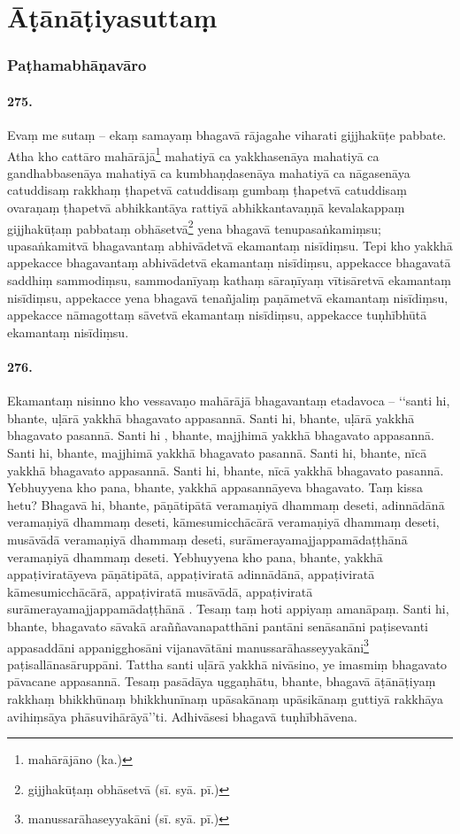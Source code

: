 \section{Āṭānāṭiyasuttaṃ}

\subsubsection{Paṭhamabhāṇavāro}

\paragraph{275.} Evaṃ me sutaṃ – ekaṃ samayaṃ bhagavā rājagahe viharati gijjhakūṭe pabbate. Atha kho cattāro mahārājā\footnote{mahārājāno (ka.)} mahatiyā ca yakkhasenāya mahatiyā ca gandhabbasenāya mahatiyā ca kumbhaṇḍasenāya mahatiyā ca nāgasenāya catuddisaṃ rakkhaṃ ṭhapetvā catuddisaṃ gumbaṃ ṭhapetvā catuddisaṃ ovaraṇaṃ ṭhapetvā abhikkantāya rattiyā abhikkantavaṇṇā kevalakappaṃ gijjhakūṭaṃ pabbataṃ obhāsetvā\footnote{gijjhakūṭaṃ obhāsetvā (sī. syā. pī.)} yena bhagavā tenupasaṅkamiṃsu; upasaṅkamitvā bhagavantaṃ abhivādetvā ekamantaṃ nisīdiṃsu. Tepi kho yakkhā appekacce bhagavantaṃ abhivādetvā ekamantaṃ nisīdiṃsu, appekacce bhagavatā saddhiṃ sammodiṃsu, sammodanīyaṃ kathaṃ sāraṇīyaṃ vītisāretvā ekamantaṃ nisīdiṃsu, appekacce yena bhagavā tenañjaliṃ paṇāmetvā ekamantaṃ nisīdiṃsu, appekacce nāmagottaṃ sāvetvā ekamantaṃ nisīdiṃsu, appekacce tuṇhībhūtā ekamantaṃ nisīdiṃsu.

\paragraph{276.} Ekamantaṃ nisinno kho vessavaṇo mahārājā bhagavantaṃ etadavoca – ‘‘santi hi, bhante, uḷārā yakkhā bhagavato appasannā. Santi hi, bhante, uḷārā yakkhā bhagavato pasannā. Santi hi , bhante, majjhimā yakkhā bhagavato appasannā. Santi hi, bhante, majjhimā yakkhā bhagavato pasannā. Santi hi, bhante, nīcā yakkhā bhagavato appasannā. Santi hi, bhante, nīcā yakkhā bhagavato pasannā. Yebhuyyena kho pana, bhante, yakkhā appasannāyeva bhagavato. Taṃ kissa hetu? Bhagavā hi, bhante, pāṇātipātā veramaṇiyā dhammaṃ deseti, adinnādānā veramaṇiyā dhammaṃ deseti, kāmesumicchācārā veramaṇiyā dhammaṃ deseti, musāvādā veramaṇiyā dhammaṃ deseti, surāmerayamajjappamādaṭṭhānā veramaṇiyā dhammaṃ deseti. Yebhuyyena kho pana, bhante, yakkhā appaṭiviratāyeva pāṇātipātā, appaṭiviratā adinnādānā, appaṭiviratā kāmesumicchācārā, appaṭiviratā musāvādā, appaṭiviratā surāmerayamajjappamādaṭṭhānā . Tesaṃ taṃ hoti appiyaṃ amanāpaṃ. Santi hi, bhante, bhagavato sāvakā araññavanapatthāni pantāni senāsanāni paṭisevanti appasaddāni appanigghosāni vijanavātāni manussarāhasseyyakāni\footnote{manussarāhaseyyakāni (sī. syā. pī.)} paṭisallānasāruppāni. Tattha santi uḷārā yakkhā nivāsino, ye imasmiṃ bhagavato pāvacane appasannā. Tesaṃ pasādāya uggaṇhātu, bhante, bhagavā āṭānāṭiyaṃ rakkhaṃ bhikkhūnaṃ bhikkhunīnaṃ upāsakānaṃ upāsikānaṃ guttiyā rakkhāya avihiṃsāya phāsuvihārāyā’’ti. Adhivāsesi bhagavā tuṇhībhāvena.

